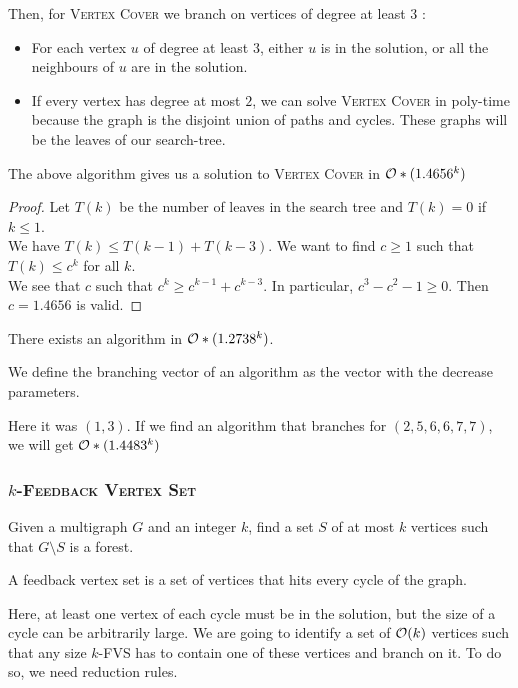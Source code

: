 \documentclass{cours}
\begin{document}
Then, for \textsc{Vertex Cover} we branch on vertices of degree at least $3$ :
\begin{itemize}
    \item For each vertex $u$ of degree at least $3$, either $u$ is in the solution, or all the neighbours of $u$ are in the solution.
    \item If every vertex has degree at most $2$, we can solve \textsc{Vertex Cover} in poly-time because the graph is the disjoint union of paths and cycles. These graphs will be the leaves of our search-tree.
\end{itemize}


\begin{proposition}
    The above algorithm gives us a solution to \textsc{Vertex Cover} in $\mathcal{O}*(1.4656^{k})$
\end{proposition}
\begin{proof}
    Let $T(k)$ be the number of leaves in the search tree and $T(k) = 0$ if $k \leq 1$. \\
    We have $T(k) \leq T(k - 1) + T(k - 3)$. We want to find $c \geq 1$ such that $T(k) \leq c^{k}$ for all $k$. \\
    We see that $c$ such that $c^{k} \geq c^{k - 1} + c^{k - 3}$. In particular, $c^{3} - c^{2} - 1 \geq 0$. Then $c = 1.4656$ is valid.
\end{proof}
\begin{remark}
    There exists an algorithm in $\mathcal{O}*(1.2738^{k})$.
\end{remark}

\begin{definition}
    We define the branching vector of an algorithm as the vector with the decrease parameters.
\end{definition}
Here it was $(1, 3)$. If we find an algorithm that branches for $(2, 5, 6, 6, 7, 7)$, we will get $\mathcal{O}*(1.4483^{k})$

\subsubsection{$k$-\textsc{Feedback Vertex Set}}
\begin{definition}
    Given a multigraph $G$ and an integer $k$, find a set $S$ of at most $k$ vertices such that $G \setminus S$ is a forest.
\end{definition}
A feedback vertex set is a set of vertices that hits every cycle of the graph.

Here, at least one vertex of each cycle must be in the solution, but the size of a cycle can be arbitrarily large. We are going to identify a set of $\mathcal{O}(k)$ vertices such that any size $k$-FVS has to contain one of these vertices and branch on it. To do so, we need reduction rules.
\end{document}
